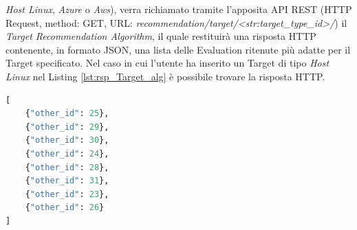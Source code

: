 \textit{Host Linux}, \textit{Azure} o \textit{Aws}), verra richiamato tramite l'apposita API REST (HTTP Request, method: GET, URL: 
\textit{recommendation/target/<str:target\_type\_id>/}) il \textit{Target Recommendation Algorithm}, il quale restituirà una 
risposta HTTP contenente, in formato JSON, una lista delle Evaluation ritenute più adatte per il Target specificato. Nel caso 
in cui l'utente ha inserito un Target di tipo \textit{Host Linux} nel Listing \ref{lst:rsp_Target_alg} è possibile trovare la risposta HTTP.
\lstset{style=python_code_style}
\begin{lstlisting}[language=Python, label=lst:rsp_Target_alg, caption={URL: /recommendation/target/1/ }]
[
    {"other_id": 25},
    {"other_id": 29},
    {"other_id": 30},
    {"other_id": 24},
    {"other_id": 28},
    {"other_id": 31},
    {"other_id": 23},
    {"other_id": 26}
]
\end{lstlisting}